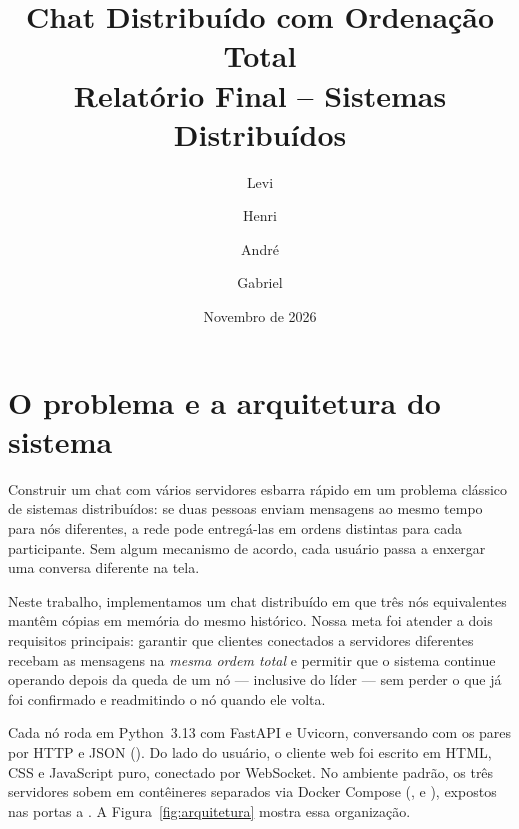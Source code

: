 \documentclass[10pt,a4paper]{article}
\title{\textbf{Chat Distribuído com Ordenação Total}\\[2pt]
\large Relatório Final -- Sistemas Distribuídos}
\author{Levi \and Henri \and André \and Gabriel}
\date{Novembro de 2026}
\newcommand{\msg}[1]{\texttt{\detokenize{#1}}}
\begin{document}
\maketitle
\vspace{-1.7em}

\section{O problema e a arquitetura do sistema}

Construir um chat com vários servidores esbarra rápido em um problema clássico de sistemas distribuídos: se duas pessoas enviam mensagens ao mesmo tempo para nós diferentes, a rede pode entregá-las em ordens distintas para cada participante. Sem algum mecanismo de acordo, cada usuário passa a enxergar uma conversa diferente na tela.

Neste trabalho, implementamos um chat distribuído em que três nós equivalentes mantêm cópias em memória do mesmo histórico. Nossa meta foi atender a dois requisitos principais: garantir que clientes conectados a servidores diferentes recebam as mensagens na \emph{mesma ordem total} e permitir que o sistema continue operando depois da queda de um nó — inclusive do líder — sem perder o que já foi confirmado e readmitindo o nó quando ele volta.

Cada nó roda em Python~3.13 com FastAPI e Uvicorn, conversando com os pares por HTTP e JSON (\msg{httpx}). Do lado do usuário, o cliente web foi escrito em HTML, CSS e JavaScript puro, conectado por WebSocket. No ambiente padrão, os três servidores sobem em contêineres separados via Docker Compose (\msg{no1}, \msg{no2} e \msg{no3}), expostos nas portas \msg{8001} a \msg{8003}. A Figura~\ref{fig:arquitetura} mostra essa organização.
\end{document}
